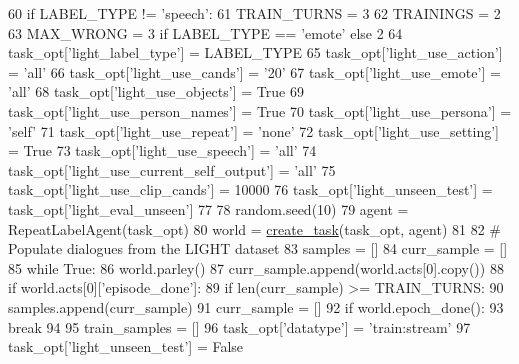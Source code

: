 \begin{DoxyCode}
60     \textcolor{keywordflow}{if} LABEL\_TYPE != \textcolor{stringliteral}{'speech'}:
61         TRAIN\_TURNS = 3
62         TRAININGS = 2
63         MAX\_WRONG = 3 \textcolor{keywordflow}{if} LABEL\_TYPE == \textcolor{stringliteral}{'emote'} \textcolor{keywordflow}{else} 2
64     task\_opt[\textcolor{stringliteral}{'light\_label\_type'}] = LABEL\_TYPE
65     task\_opt[\textcolor{stringliteral}{'light\_use\_action'}] = \textcolor{stringliteral}{'all'}
66     task\_opt[\textcolor{stringliteral}{'light\_use\_cands'}] = \textcolor{stringliteral}{'20'}
67     task\_opt[\textcolor{stringliteral}{'light\_use\_emote'}] = \textcolor{stringliteral}{'all'}
68     task\_opt[\textcolor{stringliteral}{'light\_use\_objects'}] = \textcolor{keyword}{True}
69     task\_opt[\textcolor{stringliteral}{'light\_use\_person\_names'}] = \textcolor{keyword}{True}
70     task\_opt[\textcolor{stringliteral}{'light\_use\_persona'}] = \textcolor{stringliteral}{'self'}
71     task\_opt[\textcolor{stringliteral}{'light\_use\_repeat'}] = \textcolor{stringliteral}{'none'}
72     task\_opt[\textcolor{stringliteral}{'light\_use\_setting'}] = \textcolor{keyword}{True}
73     task\_opt[\textcolor{stringliteral}{'light\_use\_speech'}] = \textcolor{stringliteral}{'all'}
74     task\_opt[\textcolor{stringliteral}{'light\_use\_current\_self\_output'}] = \textcolor{stringliteral}{'all'}
75     task\_opt[\textcolor{stringliteral}{'light\_use\_clip\_cands'}] = 10000
76     task\_opt[\textcolor{stringliteral}{'light\_unseen\_test'}] = task\_opt[\textcolor{stringliteral}{'light\_eval\_unseen'}]
77 
78     random.seed(10)
79     agent = RepeatLabelAgent(task\_opt)
80     world = \hyperlink{namespaceparlai_1_1core_1_1worlds_a79969c7ba76d4b3c500f5bb776444dc6}{create\_task}(task\_opt, agent)
81 
82     \textcolor{comment}{# Populate dialogues from the LIGHT dataset}
83     samples = []
84     curr\_sample = []
85     \textcolor{keywordflow}{while} \textcolor{keyword}{True}:
86         world.parley()
87         curr\_sample.append(world.acts[0].copy())
88         \textcolor{keywordflow}{if} world.acts[0][\textcolor{stringliteral}{'episode\_done'}]:
89             \textcolor{keywordflow}{if} len(curr\_sample) >= TRAIN\_TURNS:
90                 samples.append(curr\_sample)
91             curr\_sample = []
92         \textcolor{keywordflow}{if} world.epoch\_done():
93             \textcolor{keywordflow}{break}
94 
95     train\_samples = []
96     task\_opt[\textcolor{stringliteral}{'datatype'}] = \textcolor{stringliteral}{'train:stream'}
97     task\_opt[\textcolor{stringliteral}{'light\_unseen\_test'}] = \textcolor{keyword}{False}

\end{DoxyCode}
